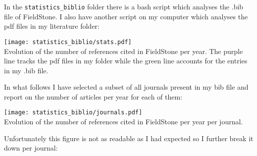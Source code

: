 
In the {\tt statistics\_biblio} folder there is a bash script which 
analyses the .bib file of FieldStone. I also have another script on 
my computer which analyses the pdf files in my literature folder:

\begin{center}
\texttt{[image: statistics\_biblio/stats.pdf]}\\
{\captionfont Evolution of the number of references cited in FieldStone
per year. The purple line tracks the pdf files in my folder while 
the green line accounts for the entries in my .bib file.}
\end{center}

In what follows I have selected a subset of all journals present in 
my bib file and report on the number of articles per year for each of them:

\begin{center}
\texttt{[image: statistics\_biblio/journals.pdf]}\\
{\captionfont Evolution of the number of references cited in FieldStone
per year per journal.}
\end{center}

Unfortunately this figure is not as readable as I had expected 
so I further break it down per journal:


